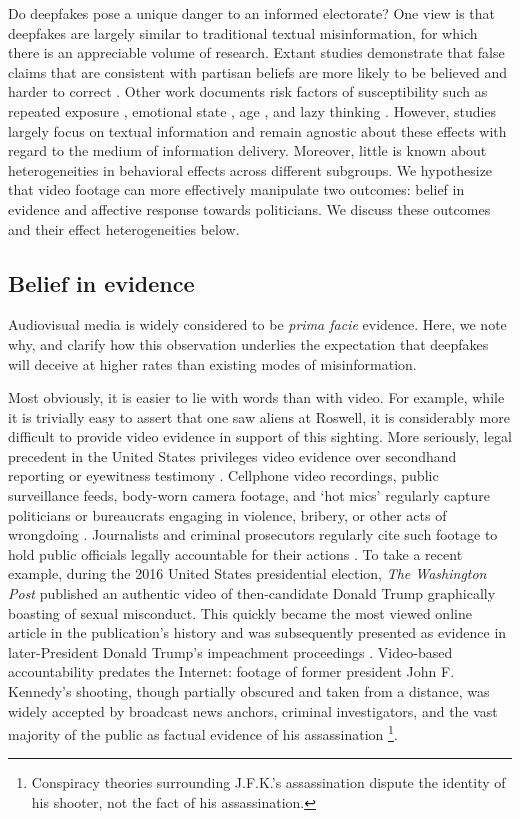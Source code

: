 \documentclass[12pt,letterpaper]{article}
\begin{document}
Do deepfakes pose a unique danger to an informed electorate? One view is that deepfakes are largely similar to traditional textual misinformation, for which there is an appreciable volume of research. Extant studies demonstrate that false claims that are consistent with partisan beliefs are more likely to be believed and harder to correct \citep{weeks15,nyhan2010corrections,kahan2012ideology,thorson16}. Other work documents risk factors of susceptibility such as repeated exposure \citep{pennycook2018prior}, emotional state \citep{weeks15}, age \citep{guess19}, and lazy thinking \citep{pennycook2019lazy}. However, studies largely focus on textual information and remain agnostic about these effects with regard to the medium of information delivery. Moreover, little is known about heterogeneities in behavioral effects across different subgroups. We hypothesize that video footage can more effectively manipulate two outcomes: belief in evidence and affective response towards politicians. We discuss these outcomes and their effect heterogeneities below.

\subsection{Belief in evidence}

Audiovisual media is widely considered to be \textit{prima facie} evidence. Here, we note why, and clarify how this observation underlies the expectation that deepfakes will deceive at higher rates than existing modes of misinformation. 

Most obviously, it is easier to lie with words than with video. For example, while it is trivially easy to assert that one saw aliens at Roswell, it is considerably more difficult to provide video evidence in support of this sighting. More seriously, legal precedent in the United States privileges video evidence over secondhand reporting or eyewitness testimony \citep{wallace2009watchdog}. Cellphone video recordings, public surveillance feeds, body-worn camera footage, and `hot mics' regularly capture politicians or bureaucrats engaging in violence, bribery, or other acts of wrongdoing \citep{npr2005bribes, dietrich2017bodycam, fahrenthold2016trump}. Journalists and criminal prosecutors regularly cite such footage to hold public officials legally accountable for their actions \citep{puglisi2011newspaper}. To take a recent example, during the 2016 United States presidential election, \textit{The Washington Post} published an authentic video of then-candidate Donald Trump graphically boasting of sexual misconduct. This quickly became the most viewed online article in the publication's history \citep{farhi2016trump} and was subsequently presented as evidence in later-President Donald Trump's impeachment proceedings \citep{baker2020testify}. Video-based accountability predates the Internet: footage of former president John F. Kennedy's shooting, though partially obscured and taken from a distance, was widely accepted by broadcast news anchors, criminal investigators, and the vast majority of the public as factual evidence of his assassination \citep{mchoskey1995case}\footnote{Conspiracy theories surrounding J.F.K.'s assassination dispute the identity of his shooter, not the fact of his assassination.}.
\end{document}
